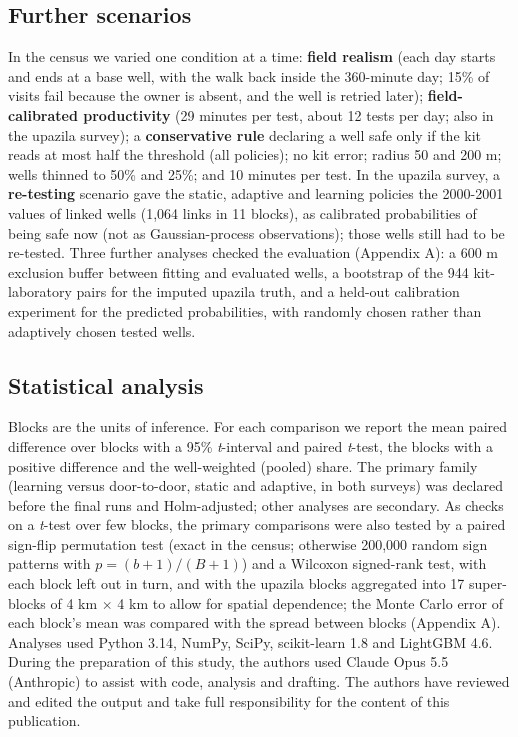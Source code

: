 \documentclass[sustainability,article,submit,pdftex,moreauthors]{Definitions/mdpi}
\begin{document}
\subsection{Further scenarios}

In the census we varied one condition at a time: \textbf{field realism} (each day starts and ends at a base well, with the walk back inside the 360-minute day; 15\% of visits fail because the owner is absent, and the well is retried later); \textbf{field-calibrated productivity} (29 minutes per test, about 12 tests per day; also in the upazila survey); a \textbf{conservative rule} declaring a well safe only if the kit reads at most half the threshold (all policies); no kit error; radius 50 and 200 m; wells thinned to 50\% and 25\%; and 10 minutes per test. In the upazila survey, a \textbf{re-testing} scenario gave the static, adaptive and learning policies the 2000-2001 values of linked wells (1,064 links in 11 blocks), as calibrated probabilities of being safe now (not as Gaussian-process observations); those wells still had to be re-tested. Three further analyses checked the evaluation (Appendix A): a 600 m exclusion buffer between fitting and evaluated wells, a bootstrap of the 944 kit-laboratory pairs for the imputed upazila truth, and a held-out calibration experiment for the predicted probabilities, with randomly chosen rather than adaptively chosen tested wells.

\subsection{Statistical analysis}

Blocks are the units of inference. For each comparison we report the mean paired difference over blocks with a 95\% \textit{t}-interval and paired \textit{t}-test, the blocks with a positive difference and the well-weighted (pooled) share. The primary family (learning versus door-to-door, static and adaptive, in both surveys) was declared before the final runs and Holm-adjusted; other analyses are secondary. As checks on a \textit{t}-test over few blocks, the primary comparisons were also tested by a paired sign-flip permutation test (exact in the census; otherwise 200,000 random sign patterns with $p = (b + 1)/(B + 1)$) and a Wilcoxon signed-rank test, with each block left out in turn, and with the upazila blocks aggregated into 17 super-blocks of 4 km $\times$ 4 km to allow for spatial dependence; the Monte Carlo error of each block's mean was compared with the spread between blocks (Appendix A). Analyses used Python 3.14, NumPy, SciPy, scikit-learn 1.8 and LightGBM 4.6. During the preparation of this study, the authors used Claude Opus 5.5 (Anthropic) to assist with code, analysis and drafting. The authors have reviewed and edited the output and take full responsibility for the content of this publication.
\end{document}
